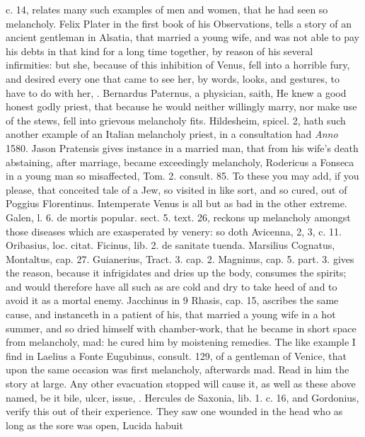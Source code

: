 {c. 14, relates many such examples of men and women, that he had seen so
melancholy. Felix Plater in the first book of his Observations,
tells a story of an ancient gentleman in Alsatia, that married a
young wife, and was not able to pay his debts in that kind for a long
time together, by reason of his several infirmities: but she, because
of this inhibition of Venus, fell into a horrible fury, and desired
every one that came to see her, by words, looks, and gestures, to have
to do with her, \etc{}. Bernardus Paternus, a physician, saith, He
knew a good honest godly priest, that because he would neither
willingly marry, nor make use of the stews, fell into grievous
melancholy fits. Hildesheim, spicel. 2, hath such another example of an
Italian melancholy priest, in a consultation had \emph{Anno} 1580. Jason
Pratensis gives instance in a married man, that from his wife's death
abstaining, after marriage, became exceedingly melancholy,
Rodericus a Fonseca in a young man so misaffected, Tom. 2. consult. 85.
To these you may add, if you please, that conceited tale of a Jew, so
visited in like sort, and so cured, out of Poggius Florentinus.
Intemperate Venus is all but as bad in the other extreme. Galen, l. 6.
de mortis popular. sect. 5. text. 26, reckons up melancholy amongst
those diseases which are exasperated by venery: so doth Avicenna,
2, 3, c. 11. Oribasius, loc. citat. Ficinus, lib. 2. de sanitate
tuenda. Marsilius Cognatus, Montaltus, cap. 27. Guianerius, Tract. 3.
cap. 2. Magninus, cap. 5. part. 3. gives the reason, because
it infrigidates and dries up the body, consumes the spirits; and
would therefore have all such as are cold and dry to take heed of and
to avoid it as a mortal enemy. Jacchinus in 9 Rhasis, cap. 15, ascribes
the same cause, and instanceth in a patient of his, that married a
young wife in a hot summer, and so dried himself with
chamber-work, that he became in short space from melancholy, mad: he
cured him by moistening remedies. The like example I find in Laelius a
Fonte Eugubinus, consult. 129, of a gentleman of Venice, that upon the
same occasion was first melancholy, afterwards mad. Read in him the
story at large.
Any other evacuation stopped will cause it, as well as these above
named, be it bile, ulcer, issue, \etc{}. Hercules de Saxonia, lib. 1.
c. 16, and Gordonius, verify this out of their experience. They saw one
wounded in the head who as long as the sore was open, Lucida habuit
}

